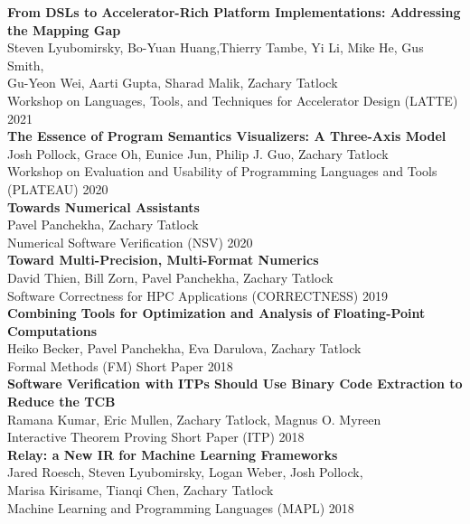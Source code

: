 \documentclass[10pt]{article}
\begin{document}
\textbf{%
From DSLs to Accelerator-Rich Platform Implementations:
Addressing the Mapping Gap
} \\
Steven Lyubomirsky, Bo-Yuan Huang,Thierry Tambe, Yi Li, Mike He, Gus Smith, \\
Gu-Yeon Wei, Aarti Gupta, Sharad Malik, Zachary Tatlock \\
Workshop on Languages, Tools, and Techniques for
Accelerator Design (LATTE) 2021 \\

\textbf{%
  The Essence of Program Semantics Visualizers: A Three-Axis Model
} \\
Josh Pollock, Grace Oh, Eunice Jun, Philip J. Guo, Zachary Tatlock \\
Workshop on Evaluation and Usability of Programming Languages and Tools (PLATEAU) 2020 \\

\textbf{%
  Towards Numerical Assistants
} \\
Pavel Panchekha, Zachary Tatlock \\
Numerical Software Verification (NSV) 2020 \\

\textbf{%
Toward Multi-Precision, Multi-Format Numerics
} \\
David Thien, Bill Zorn, Pavel Panchekha, Zachary Tatlock \\
Software Correctness for HPC Applications (CORRECTNESS) 2019 \\

\textbf{%
Combining Tools for Optimization and Analysis of Floating-Point Computations
} \\
Heiko Becker, Pavel Panchekha, Eva Darulova, Zachary Tatlock \\
Formal Methods (FM) Short Paper 2018 \\

\textbf{%
Software Verification with ITPs Should Use Binary Code Extraction to Reduce the TCB
} \\
Ramana Kumar, Eric Mullen, Zachary Tatlock, Magnus O. Myreen \\
Interactive Theorem Proving Short Paper (ITP) 2018 \\

\textbf{%
Relay: a New IR for Machine Learning Frameworks
} \\
Jared Roesch, Steven Lyubomirsky, Logan Weber, Josh Pollock, \\
Marisa Kirisame, Tianqi Chen, Zachary Tatlock \\
Machine Learning and Programming Languages (MAPL) 2018 \\
\end{document}
